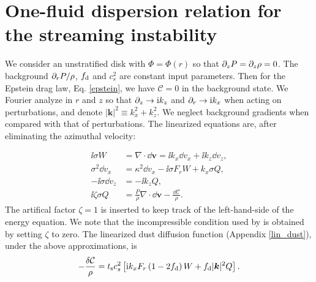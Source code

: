 \section{One-fluid dispersion relation for the streaming instability}\label{compressible_streaming}
We consider an unstratified disk with $\Phi = \Phi (r)$ so that $\partial_zP = \partial_z\rho =
0$. The background $\partial_rP/\rho$, $f_\mathrm{d}$ and $c_s^2$ are constant
input parameters. Then for the Epstein drag law, Eq. \ref{epstein}, we
have $\mathcal{C}=0$ in the background state. 
We Fourier analyze in $r$ and $z$ so that $\partial_z\to \mathrm{i} k_z$ and
$\partial_r\to \mathrm{i} k_x$ when acting on perturbations, and denote $|\bm{k}|^2
\equiv k_x^2 + k_z^2$. We neglect 
background gradients when compared with that of
perturbations. The linearized
equations are, after eliminating the azimuthal velocity: 

\begin{align}
  \ii \sigma W &=\nabla\cdot \dd \bm{ v} = \ii k_x \dd v_x + \ii k_z \dd v_z,\\
    \sigma^2 \dd v_x &= \kappa^2 \dd v_x - \ii \sigma F_r W +
    k_x\sigma Q,\\
  -\ii\sigma\dd v_z &= -\ii k_zQ,\\
\ii \zeta \sigma  Q & = \frac{P}{\rho} \nabla \cdot \dd\bm{v}   -
  \frac{\dd \mathcal{C}}{\rho}. 
\end{align}
The artifical factor $\zeta = 1$  is inserted to keep track of the
left-hand-side of the energy equation. We note that the incompressible
condition used by \cite{jacquet11} is obtained by setting $\zeta$ to zero. 
The linearized dust diffusion
function (Appendix \ref{lin_dust}), 
under the above approximations, is 
\begin{align}
-\frac{\delta \mathcal{C}}{\rho}  = t_\mathrm{s} c_s^2 \left[\mathrm{i} k_x F_r\left( 1-2f_\mathrm{d}\right)
  W + f_\mathrm{d} |\bm{k}|^2 Q\right]. 
\end{align}

